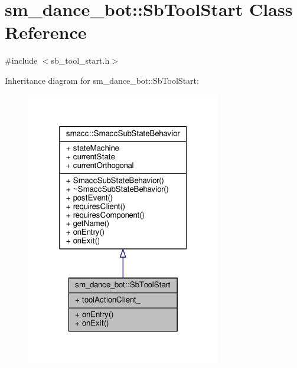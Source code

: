 \hypertarget{classsm__dance__bot_1_1SbToolStart}{}\section{sm\+\_\+dance\+\_\+bot\+:\+:Sb\+Tool\+Start Class Reference}
\label{classsm__dance__bot_1_1SbToolStart}


{\ttfamily \#include $<$sb\+\_\+tool\+\_\+start.\+h$>$}



Inheritance diagram for sm\+\_\+dance\+\_\+bot\+:\+:Sb\+Tool\+Start\+:
\nopagebreak
\begin{figure}[H]
\begin{center}
\leavevmode
\includegraphics[width=241pt]{classsm__dance__bot_1_1SbToolStart__inherit__graph}
\end{center}
\end{figure}


